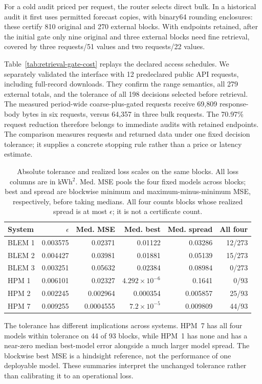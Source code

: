 For a cold audit priced per request, the router selects direct bulk. In a
historical audit it first uses permitted forecast copies, with binary64
rounding enclosures: these certify 810 original and 270 external blocks.
With endpoints retained, after the initial gate only nine original and three external blocks need
fine retrieval, covered by three requests/51 values and two requests/22 values.

Table~\ref{tab:retrieval-gate-cost} replays the declared access schedules.
We separately validated the interface with 12 predeclared public API requests,
including full-record downloads. They confirm the range semantics, all 279
external totals, and the tolerance of all 198 decisions selected before
retrieval. The measured period-wide coarse-plus-gated requests receive 69,809
response-body bytes in six requests, versus 64,357 in three bulk requests.
The 70.97\% request reduction therefore belongs to immediate audits with
retained endpoints. The comparison measures requests and returned data under
one fixed decision tolerance; it supplies a concrete stopping rule rather
than a price or latency estimate.

\begin{table}[htbp]\centering\small
\caption{Absolute tolerance and realized loss scales on the same blocks. All loss columns are in kWh$^2$. Med. MSE pools the four fixed models across blocks; best and spread are blockwise minimum and maximum-minus-minimum MSE, respectively, before taking medians. All four counts blocks whose realized spread is at most $\epsilon$; it is not a certificate count.}
\label{tab:retrieval-tolerance-scale}
\begin{tabular}{lrrrrr}\toprule
System & $\epsilon$ & Med. MSE & Med. best & Med. spread & All four\\\midrule
BLEM 1 & 0.003575 & 0.02371 & 0.01122 & 0.03286 & 12/273\\
BLEM 2 & 0.004427 & 0.03981 & 0.01881 & 0.05139 & 15/273\\
BLEM 3 & 0.003251 & 0.05632 & 0.02384 & 0.08984 & 0/273\\
HPM 1 & 0.006101 & 0.02327 & $4.292\times10^{-6}$ & 0.1641 & 0/93\\
HPM 2 & 0.002245 & 0.002964 & 0.000354 & 0.005857 & 25/93\\
HPM 7 & 0.009255 & 0.0004555 & $7.2\times10^{-5}$ & 0.009809 & 44/93\\
\bottomrule\end{tabular}\end{table}
The tolerance has different implications across systems. HPM~7 has all four models within tolerance on 44 of 93 blocks, while HPM~1 has none and has a near-zero median best-model error alongside a much larger model spread. The blockwise best MSE is a hindsight reference, not the performance of one deployable model. These summaries interpret the unchanged tolerance rather than calibrating it to an operational loss.

